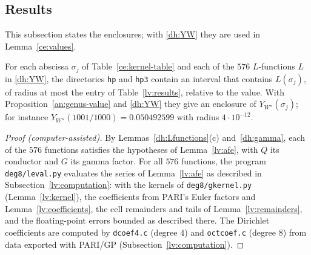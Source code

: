 \subsection{Results}\label{lv:results-section}
This subsection states the enclosures; with \eqref{dh:YW} they are used in
Lemma~\ref{ce:values}.

\begin{proposition}\label{lv:values}
For each abscissa $\sigma_j$ of Table~\ref{ce:kernel-table} and each of the
$576$ $L$-functions $L$ in \eqref{dh:YW}, the directories \texttt{hp} and
\texttt{hp3} contain an interval that contains $L(\sigma_j)$, of radius at
most the entry of Table~\ref{lv:results}, relative to the value. With
Proposition~\ref{an:genus-value} and
\eqref{dh:YW} they give an enclosure of $Y_{W''}(\sigma_j)$; for instance
$Y_{W''}(1001/1000)=0.050492599$ with radius $4\cdot10^{-12}$.
\end{proposition}

\begin{proof}[Proof (computer-assisted)]
By Lemmas~\ref{dh:Lfunctions}(c) and~\ref{dh:gamma}, each of the $576$
functions satisfies the hypotheses of Lemma~\ref{lv:afe}, with $Q$ its
conductor and $G$ its gamma factor. For all $576$ functions, the program
\texttt{deg8/leval.py} evaluates the series of Lemma~\ref{lv:afe} as
described in Subsection~\ref{lv:computation}: with the kernels of
\texttt{deg8/gkernel.py} (Lemma~\ref{lv:kernel}), the coefficients from
PARI's Euler factors and Lemma~\ref{lv:coefficients}, the cell remainders and
tails of Lemma~\ref{lv:remainders}, and the floating-point errors bounded as
described there. The Dirichlet coefficients are computed by
\texttt{dcoef4.c} (degree $4$) and \texttt{octcoef.c} (degree $8$) from data
exported with PARI/GP (Subsection~\ref{lv:computation}).
\end{proof}

